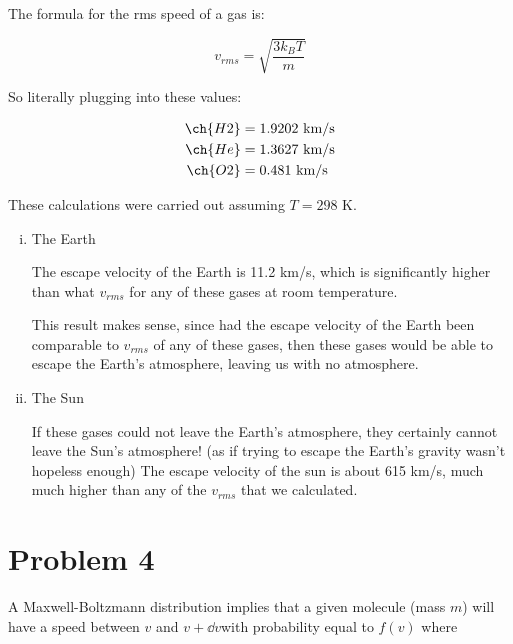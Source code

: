 \documentclass{article}
\begin{document}
    \begin{solution}
        The formula for the rms speed of a gas is:

        \[ v_{rms} = \sqrt{\frac{3k_BT}{m}}\]

        So literally plugging into these values: 

        \begin{align*}
            \ch{H2} &= 1.9202 \text{ km/s}\\
            \ch{He} &= 1.3627 \text{ km/s}\\
            \ch{O2} &= 0.481 \text{ km/s}
        \end{align*}    

        These calculations were carried out assuming $T = 298$ K.
    \end{solution}
    \begin{enumerate}[(i)]
        \item The Earth
        
        \begin{solution}
            The escape velocity of the Earth is 11.2 km/s, which is significantly higher than what $v_{rms}$ for any of these gases at room temperature.
            
            This result makes sense, since had the escape velocity of the Earth been comparable to $v_{rms}$ of any of these gases, then these gases would be able to escape the Earth's atmosphere, leaving us with no atmosphere.
        \end{solution}
        \item The Sun
        
        \begin{solution}
            If these gases could not leave the Earth's atmosphere, they certainly cannot leave the Sun's atmosphere! (as if trying to escape the Earth's gravity wasn't hopeless enough) The escape velocity of the sun is about 615 km/s, much much higher than any of the $v_{rms}$ that we calculated. 
        \end{solution}
    \end{enumerate}

    \pagebreak

    \section*{Problem 4}

    A Maxwell-Boltzmann distribution implies that a given molecule (mass $m$) will have a speed between $v$ and $v + \dd v$with probability equal to $f(v)$ where 
\end{document}
